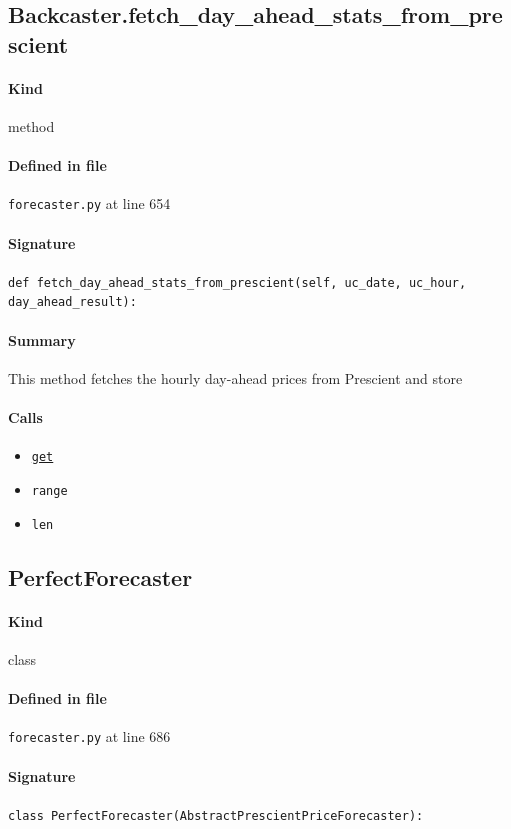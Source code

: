 \documentclass[11pt]{report}
\begin{document}
\subsection{Backcaster.fetch\_day\_ahead\_stats\_from\_prescient}
\label{def:forecaster.py:Backcaster.fetch_day_ahead_stats_from_prescient:L654}
\paragraph{Kind} method
\paragraph{Defined in file} \texttt{forecaster.py} at line 654
\paragraph{Signature} \texttt{def fetch\_day\_ahead\_stats\_from\_prescient(self, uc\_date, uc\_hour, day\_ahead\_result):}
\paragraph{Summary} This method fetches the hourly day-ahead prices from Prescient and store
\paragraph{Calls}
\begin{itemize}[leftmargin=*]
  \item \hyperref[def:tests-test_backcaster.py:DAPrices.get:L294]{\texttt{get}}
  \item \texttt{range}
  \item \texttt{len}
\end{itemize}
\subsection{PerfectForecaster}
\label{def:forecaster.py:PerfectForecaster:L686}
\paragraph{Kind} class
\paragraph{Defined in file} \texttt{forecaster.py} at line 686
\paragraph{Signature} \texttt{class PerfectForecaster(AbstractPrescientPriceForecaster):}
\end{document}
